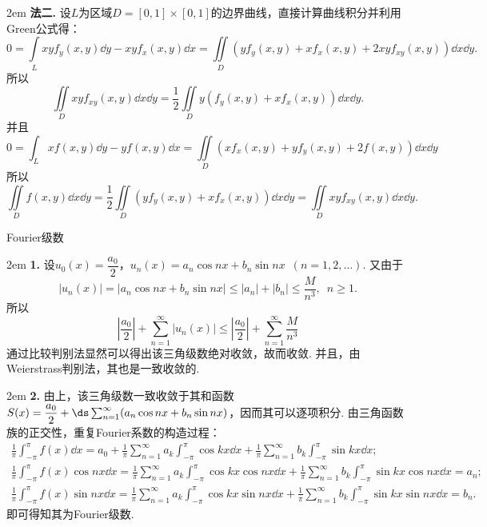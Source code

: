 \documentclass[UTF8,14pt,normal]{ctexart}
\begin{document}
    \hangindent 2em
    \noindent
    \textbf{法二.}
    设\(L\)为区域\(D = [0,1]\times[0,1]\)的边界曲线，直接计算曲线积分并利用Green公式得：
    \[0 = \int\limits_{L}xyf_y(x,y)\dd{y}-xyf_x(x,y)\dd{x} = \iint\limits_{D}(yf_y(x,y)+xf_x(x,y)+2xyf_{xy}(x,y))\dd{x}\dd{y}.\]
    所以\[\iint\limits_{D}xyf_{xy}(x,y)\dd{x}\dd{y} = \frac{1}{2}\iint\limits_{D}y(f_y(x,y)+xf_x(x,y))\dd{x}\dd{y}.\]
    并且\[0 = \int_{L}xf(x,y)\dd{y}-yf(x,y)\dd{x} = \iint\limits_{D}(xf_x(x,y)+yf_y(x,y)+2f(x,y))\dd{x}\dd{y}\]
    所以\[\iint\limits_{D}f(x,y)\dd{x}\dd{y} = \frac{1}{2}\iint\limits_{D}(yf_y(x,y)+xf_x(x,y))\dd{x}\dd{y} = \iint\limits_{D}xyf_{xy}(x,y)\dd{x}\dd{y}.\]

Fourier级数

    \hangindent 2em
    \noindent
    \textbf{1.}
    设\(u_0(x) = \dfrac{a_0}{2}\)，\(u_n(x)=a_n\cos nx+b_n\sin nx\enspace (n=1,2,\ldots)\). 又由于\[|u_n(x)|=|a_n\cos nx+b_n\sin nx|\leqslant|a_n|+|b_n|\leqslant\frac{M}{n^3},\enspace n\geqslant 1.\]
    所以\[\left\lvert\frac{a_0}{2}\right\rvert+\sum_{n=1}^\infty |u_n(x)|\leqslant\left\lvert\frac{a_0}{2}\right\rvert+\sum_{n=1}^{\infty}\frac{M}{n^3}\]
    通过比较判别法显然可以得出该三角级数绝对收敛，故而收敛. 并且，由Weierstrass判别法，其也是一致收敛的.

    \hangindent 2em
    \noindent
    \textbf{2.}
    由上，该三角级数一致收敛于其和函数\(S(x) = \dfrac{a_0}{2}+\ds \sum_{n=1}^{\infty}(a_n\cos nx+b_n\sin nx)\)，因而其可以逐项积分. 由三角函数族的正交性，重复Fourier系数的构造过程：
    \begin{gather*}
            \frac{1}{\pi}\int_{-\pi}^{\pi}f(x)\dd{x} = a_0 + \frac{1}{\pi}\sum_{n=1}^{\infty}a_k\int_{-\pi}^{\pi}\cos kx\dd{x}+\frac{1}{\pi}\sum_{n=1}^{\infty}b_k\int_{-\pi}^{\pi}\sin kx\dd{x};\\
            \frac{1}{\pi}\int_{-\pi}^{\pi}f(x)\cos nx\dd{x} = \frac{1}{\pi}\sum_{n=1}^{\infty}a_k\int_{-\pi}^{\pi}\cos kx\cos nx\dd{x}+\frac{1}{\pi}\sum_{n=1}^{\infty}b_k\int_{-\pi}^{\pi}\sin kx\cos nx\dd{x} = a_n;\\
            \frac{1}{\pi}\int_{-\pi}^{\pi}f(x)\sin nx\dd{x} = \frac{1}{\pi}\sum_{n=1}^{\infty}a_k\int_{-\pi}^{\pi}\cos kx\sin nx\dd{x}+\frac{1}{\pi}\sum_{n=1}^{\infty}b_k\int_{-\pi}^{\pi}\sin kx\sin nx\dd{x} = b_n.
    \end{gather*}
    即可得知其为Fourier级数.
\end{document}

